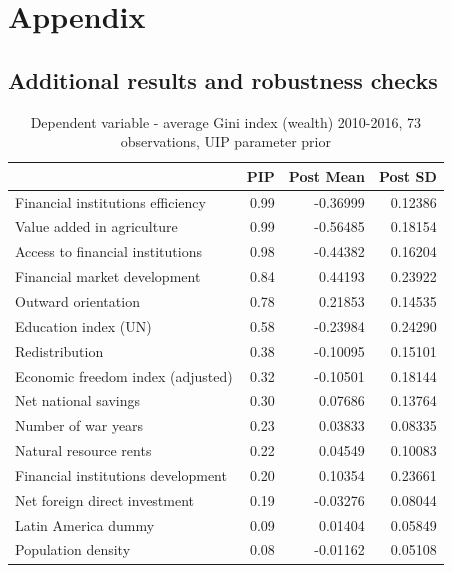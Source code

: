 \begin{refsection}
\section*{Appendix}
\begin{subappendices}
    \section{Additional results and robustness checks}
    \label{ch3sec:app_rch}
    \begin{table}[!ht]
    \footnotesize
    \centering
    \caption{Dependent variable - average Gini index (wealth) 2010-2016, 73 observations, \ac{UIP} parameter prior}
    \label{ch3table:res2}
    \begin{tabular}{lrrr}
      \toprule
     & \ac{PIP} & Post Mean & Post SD \\ 
      \midrule
      Financial institutions efficiency & 0.99 & -0.36999 & 0.12386 \\ 
      Value added in agriculture & 0.99 & -0.56485 & 0.18154 \\ 
      Access to financial institutions & 0.98 & -0.44382 & 0.16204 \\ 
      Financial market development & 0.84 & 0.44193 & 0.23922 \\ 
      Outward orientation & 0.78 & 0.21853 & 0.14535 \\ 
      Education index (UN) & 0.58 & -0.23984 & 0.24290 \\ 
      Redistribution & 0.38 & -0.10095 & 0.15101 \\ 
      Economic freedom index (adjusted) & 0.32 & -0.10501 & 0.18144 \\ 
      Net national savings & 0.30 & 0.07686 & 0.13764 \\ 
      Number of war years & 0.23 & 0.03833 & 0.08335 \\ 
      Natural resource rents & 0.22 & 0.04549 & 0.10083 \\ 
      Financial institutions development & 0.20 & 0.10354 & 0.23661 \\ 
      Net foreign direct investment & 0.19 & -0.03276 & 0.08044 \\ 
      Latin America dummy & 0.09 & 0.01404 & 0.05849 \\ 
      Population density & 0.08 & -0.01162 & 0.05108 \\ 

\end{tabular}
\end{table}
\end{subappendices}
\end{refsection}
